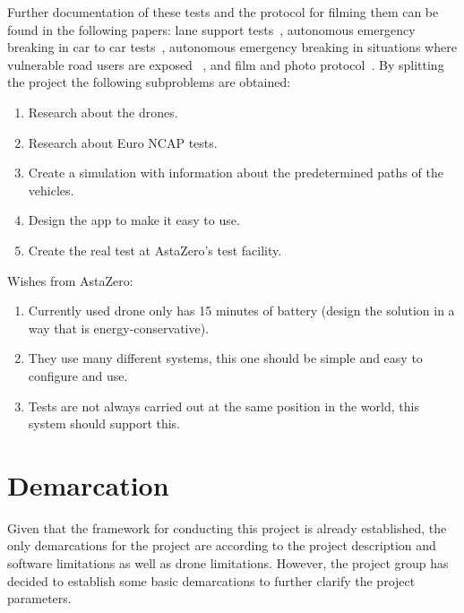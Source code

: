  Further documentation of these tests and the protocol for filming them can be found in the following papers: lane support tests~\cite{EuroNCAP2022EUROPEAN2023b}, autonomous emergency breaking in car to car tests~\cite{EuroNCAP2022EUROPEAN2023}, autonomous emergency breaking in situations where vulnerable road users are exposed ~\cite{EuroNCAP2022EUROPEANNCAPb}, and film and photo protocol~\cite{EuroNCAP2021EUROPEANPROTOCOL}. By splitting the project the following subproblems are obtained: 
\newline
    \begin{enumerate}
        \item Research about the drones.
        \item Research about Euro NCAP tests.
        \item Create a simulation with information about the predetermined paths of the vehicles.
        \item Design the app to make it easy to use.
        \item Create the real test at AstaZero's test facility.
    \end{enumerate}

Wishes from AstaZero:
\newline
    \begin{enumerate}
        \item Currently used drone only has 15 minutes of battery (design the solution in a way that is energy-conservative).
        \item They use many different systems, this one should be simple and easy to configure and use.
        \item Tests are not always carried out at the same position in the world, this system should support this.
    \end{enumerate}


\section{Demarcation} \label{chap:demarcation}
Given that the framework for conducting this project is already established, the only demarcations for the project are according to the project description and software limitations as well as drone limitations. However, the project group has decided to establish some basic demarcations to further clarify the project parameters. 

